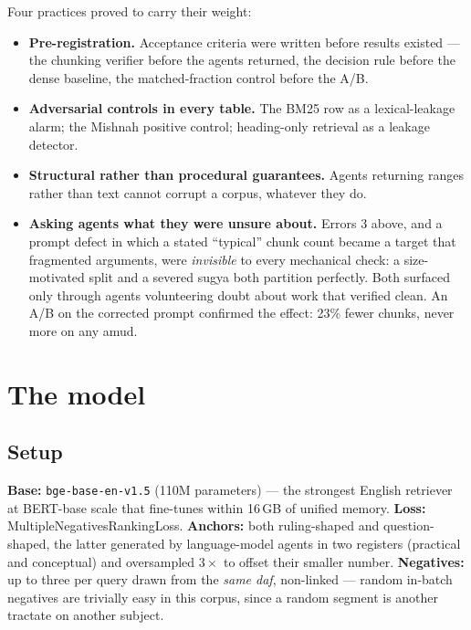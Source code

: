 \documentclass[11pt,a4paper]{article}
\begin{document}
Four practices proved to carry their weight:

\begin{itemize}[itemsep=2pt]
\item \textbf{Pre-registration.} Acceptance criteria were written before results
      existed --- the chunking verifier before the agents returned, the
      decision rule before the dense baseline, the matched-fraction control
      before the A/B.
\item \textbf{Adversarial controls in every table.} The BM25 row as a
      lexical-leakage alarm; the Mishnah positive control; heading-only
      retrieval as a leakage detector.
\item \textbf{Structural rather than procedural guarantees.} Agents returning
      ranges rather than text cannot corrupt a corpus, whatever they do.
\item \textbf{Asking agents what they were unsure about.} Errors 3 above, and a
      prompt defect in which a stated ``typical'' chunk count became a target
      that fragmented arguments, were \emph{invisible} to every mechanical
      check: a size-motivated split and a severed sugya both partition
      perfectly. Both surfaced only through agents volunteering doubt about work
      that verified clean. An A/B on the corrected prompt confirmed the effect:
      23\% fewer chunks, never more on any amud.
\end{itemize}

\section{The model}\label{sec:model}

\subsection{Setup}

\textbf{Base:} \texttt{bge-base-en-v1.5} (110M parameters) --- the strongest
English retriever at BERT-base scale that fine-tunes within 16\,GB of unified
memory. \textbf{Loss:} MultipleNegativesRankingLoss. \textbf{Anchors:} both
ruling-shaped and question-shaped, the latter generated by language-model agents
in two registers (practical and conceptual) and oversampled $3\times$ to offset
their smaller number. \textbf{Negatives:} up to three per query drawn from the
\emph{same daf}, non-linked --- random in-batch negatives are trivially easy in
this corpus, since a random segment is another tractate on another subject.
\end{document}
